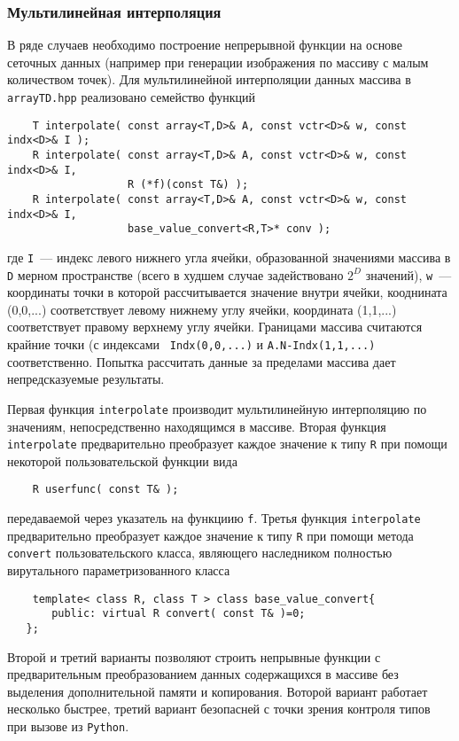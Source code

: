 \subsubsection{Мультилинейная интерполяция}
В ряде случаев необходимо построение непрерывной функции на основе сеточных
данных (например при генерации изображения по массиву с малым количеством
точек). Для мультилинейной интерполяции данных массива в {\tt arrayTD.hpp} реализовано семейство функций
\begin{verbatim}
    T interpolate( const array<T,D>& A, const vctr<D>& w, const indx<D>& I );
    R interpolate( const array<T,D>& A, const vctr<D>& w, const indx<D>& I, 
                   R (*f)(const T&) ); 
    R interpolate( const array<T,D>& A, const vctr<D>& w, const indx<D>& I, 
                   base_value_convert<R,T>* conv );
\end{verbatim}
где {\tt I}~--- индекс левого нижнего угла ячейки, образованной значениями
массива в {\tt D} мерном пространстве (всего в худшем случае задействовано
$2^D$ значений), {\tt w}~--- координаты точки в которой рассчитывается
значение внутри ячейки, кооднината (0,0,...) соответствует левому нижнему углу
ячейки, координата (1,1,...) соответствует правому верхнему углу
ячейки. Границами массива считаются крайние точки (с индексами {\tt
  Indx(0,0,...)} и {\tt A.N-Indx(1,1,...)} соответственно. Попытка рассчитать
данные за пределами массива дает непредсказуемые результаты. 

Первая функция {\tt interpolate} производит мультилинейную интерполяцию по значениям,
непосредственно находящимся в массиве. Вторая функция {\tt interpolate} предварительно
преобразует каждое значение к типу {\tt R} при помощи некоторой
пользовательской функции вида 
\begin{verbatim}
    R userfunc( const T& );
\end{verbatim}
 передаваемой через указатель на функциию {\tt f}. 
Третья функция {\tt interpolate} предварительно
преобразует каждое значение к типу {\tt R} при помощи метода {\tt convert}
пользовательского класса, являющего наследником полностью вирутального
параметризованного класса
\begin{verbatim}
	template< class R, class T > class base_value_convert{ 
       public: virtual R convert( const T& )=0; 
   };
\end{verbatim}

Второй и третий варианты позволяют строить непрывные функции с предварительным
преобразованием данных содержащихся в массиве без выделения дополнительной
памяти и копирования. Воторой вариант работает несколько быстрее, третий
вариант безопасней с точки зрения контроля типов при вызове из {\tt Python}.

